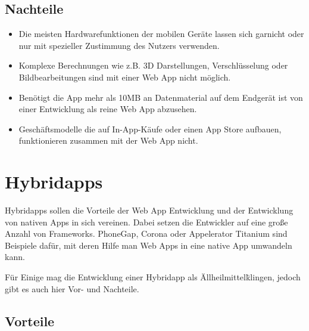\subsection{Nachteile}
\label{sec:webapp:cons}

\begin{itemize}

	\item Die meisten Hardwarefunktionen der mobilen Geräte lassen sich garnicht oder nur mit spezieller Zustimmung des Nutzers verwenden.\cite[]{WEB:APPEV:2014}

	\item Komplexe Berechnungen wie z.B. 3D Darstellungen, Verschlüsselung oder Bildbearbeitungen sind mit einer Web App nicht möglich.\cite[]{WEB:APPEV:2014}

	\item Benötigt die App mehr als 10MB an Datenmaterial auf dem Endgerät ist von einer Entwicklung als reine Web App abzusehen.\cite[]{WEB:APPEV:2014}

	\item Geschäftsmodelle die auf In-App-Käufe oder einen App Store aufbauen, funktionieren zusammen mit der Web App nicht.\cite[]{WEB:APPEV:2014}

\end{itemize}

\section{Hybridapps}
\label{sec:intro:hybrid}

Hybridapps sollen die Vorteile der Web App Entwicklung und der Entwicklung von nativen Apps in sich vereinen. Dabei setzen die Entwickler auf eine große Anzahl von Frameworks. PhoneGap, Corona oder Appelerator Titanium sind Beispiele dafür, mit deren Hilfe man Web Apps in eine native App umwandeln kann.

Für Einige mag die Entwicklung einer Hybridapp als \"Allheilmittel\" klingen, jedoch gibt es auch hier Vor- und Nachteile.\cite[]{WEB:APPEV:2014}

\subsection{Vorteile}
\label{sec:hybrid:pros}

